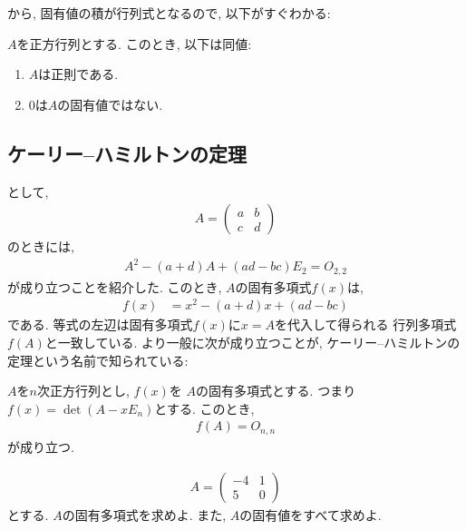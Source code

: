   から,
  固有値の積が行列式となるので,
  以下がすぐわかる:
  \begin{cor}
    $A$を正方行列とする.
    このとき, 以下は同値:
    \begin{enumerate}
    \item $A$は正則である.
    \item $0$は$A$の固有値ではない.
    \end{enumerate}
  \end{cor}

\subsection{ケーリー--ハミルトンの定理}
  として,
  \begin{align*}
    A=\begin{pmatrix}a&b\\c&d\end{pmatrix}
  \end{align*}
  のときには,
  \begin{align*}
   A^2-(a+d)A+(ad-bc)E_2=O_{2,2}
  \end{align*}
  が成り立つことを紹介した.
  このとき, $A$の固有多項式$f(x)$は,
  \begin{align*}
    f(x)&=x^2-(a+d)x+(ad-bc)
  \end{align*}
  である.
  等式の左辺は固有多項式$f(x)$に$x=A$を代入して得られる
  行列多項式$f(A)$と一致している.
  より一般に次が成り立つことが,
  ケーリー--ハミルトンの定理という名前で知られている: 
\begin{theorem}
  \label{thm:cht:general}
  $A$を$n$次正方行列とし,
  $f(x)$を 
  $A$の固有多項式とする.
  つまり $f(x)=\det(A-xE_n)$とする.
  このとき,
  \begin{align*}
    f(A)=O_{n,n}
  \end{align*}
  が成り立つ.
\end{theorem}



\begin{quiz}
  \label{quiz:6:1}
  \begin{align*}
    A=\begin{pmatrix}-4&1\\5&0\end{pmatrix}
  \end{align*}
  とする.
  $A$の固有多項式を求めよ. また, $A$の固有値をすべて求めよ.
\end{quiz}

